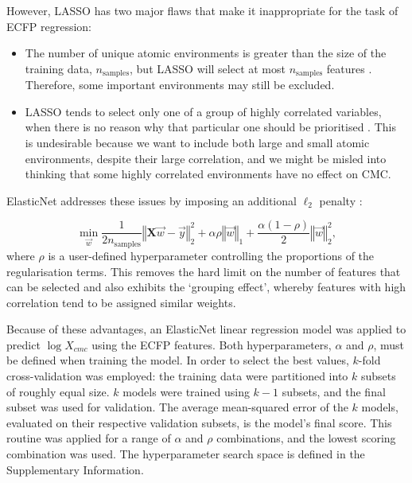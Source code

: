 However, LASSO has two major flaws that make it inappropriate for the task of
ECFP regression:

\begin{itemize}
    \item The number of unique atomic environments is greater than the size of
          the training data, $n_\text{samples}$, but LASSO will select at most
          $n_\text{samples}$ features \cite{efronLeastAngleRegression2004}.
          Therefore, some important environments may still be excluded.
    \item LASSO tends to select only one of a group of highly correlated
          variables, when there is no reason why that particular one should be
          prioritised \cite{zouRegularizationVariableSelection2005}. This is
          undesirable because we want to include both large and small atomic
          environments, despite their large correlation, and we might be misled into
          thinking that some highly correlated environments have no effect on CMC.
\end{itemize}

ElasticNet addresses these issues by imposing an additional $\ell_2$ penalty \cite{zouRegularizationVariableSelection2005}:

\begin{equation}
    \label{eq:elastic}
    \min_{\vec{w}} { \frac{1}{2n_{\text{samples}}} \left \Vert \mathbf{X}\vec{w} - \vec{y} \right \Vert_2 ^ 2 + \alpha\rho \left \Vert \vec{w} \right \Vert_1} + \frac{\alpha(1 - \rho)}{2} \left \Vert \vec{w} \right \Vert_2^2,
\end{equation}
where $\rho$ is a user-defined hyperparameter controlling the proportions of the
regularisation terms. This removes the hard limit on the number of features that can be
selected and also exhibits the `grouping effect', whereby features with high correlation
tend to be assigned similar weights.

Because of these advantages, an ElasticNet linear regression model was applied
to predict $\log X_{cmc}$ using the ECFP features. Both hyperparameters,
$\alpha$ and $\rho$, must be defined when training the model. In order to select
the best values, $k$-fold cross-validation was employed: the training data were
partitioned into $k$ subsets of roughly equal size. $k$ models were trained
using $k-1$ subsets, and the final subset was used for validation. The average
mean-squared error of the $k$ models, evaluated on their respective validation
subsets, is the model's final score. This routine was applied for a range of
$\alpha$ and $\rho$ combinations, and the lowest scoring combination was used.
The hyperparameter search space is defined in the Supplementary Information.


